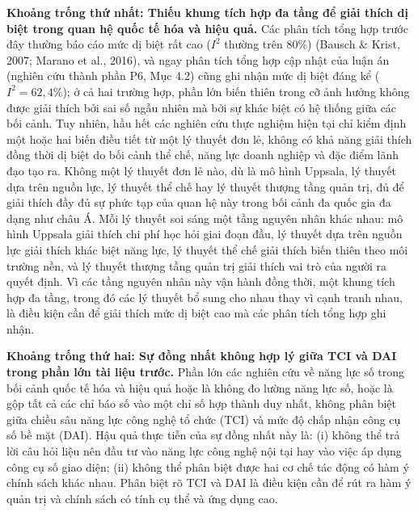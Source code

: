 \documentclass[
  a4paper,
  13pt]{extreport}
\begin{document}
\textbf{Khoảng trống thứ nhất: Thiếu khung tích hợp đa tầng để giải
thích dị biệt trong quan hệ quốc tế hóa và hiệu quả.} Các phân tích tổng
hợp trước đây thường báo cáo mức dị biệt rất cao (\(I^2\) thường trên
80\%) (Bausch \& Krist, 2007; Marano et al., 2016), và ngay phân tích
tổng hợp cập nhật của luận án (nghiên cứu thành phần P6, Mục 4.2) cũng
ghi nhận mức dị biệt đáng kể (\(I^2 = 62{,}4\%\)); ở cả hai trường hợp,
phần lớn biến thiên trong cỡ ảnh hưởng không được giải thích bởi sai số
ngẫu nhiên mà bởi sự khác biệt có hệ thống giữa các bối cảnh. Tuy nhiên,
hầu hết các nghiên cứu thực nghiệm hiện tại chỉ kiểm định một hoặc hai
biến điều tiết từ một lý thuyết đơn lẻ, không có khả năng giải thích
đồng thời dị biệt do bối cảnh thể chế, năng lực doanh nghiệp và đặc điểm
lãnh đạo tạo ra. Không một lý thuyết đơn lẻ nào, dù là mô hình Uppsala,
lý thuyết dựa trên nguồn lực, lý thuyết thể chế hay lý thuyết thượng
tầng quản trị, đủ để giải thích đầy đủ sự phức tạp của quan hệ này trong
bối cảnh đa quốc gia đa dạng như châu Á. Mỗi lý thuyết soi sáng một tầng
nguyên nhân khác nhau: mô hình Uppsala giải thích chi phí học hỏi giai
đoạn đầu, lý thuyết dựa trên nguồn lực giải thích khác biệt năng lực, lý
thuyết thể chế giải thích biến thiên theo môi trường nền, và lý thuyết
thượng tầng quản trị giải thích vai trò của người ra quyết định. Vì các
tầng nguyên nhân này vận hành đồng thời, một khung tích hợp đa tầng,
trong đó các lý thuyết bổ sung cho nhau thay vì cạnh tranh nhau, là điều
kiện cần để giải thích mức dị biệt cao mà các phân tích tổng hợp ghi
nhận.

\textbf{Khoảng trống thứ hai: Sự đồng nhất không hợp lý giữa TCI và DAI
trong phần lớn tài liệu trước.} Phần lớn các nghiên cứu về năng lực số
trong bối cảnh quốc tế hóa và hiệu quả hoặc là không đo lường năng lực
số, hoặc là gộp tất cả các chỉ báo số vào một chỉ số hợp thành duy nhất,
không phân biệt giữa chiều sâu năng lực công nghệ tổ chức (TCI) và mức
độ chấp nhận công cụ số bề mặt (DAI). Hậu quả thực tiễn của sự đồng nhất
này là: (i) không thể trả lời câu hỏi liệu nên đầu tư vào năng lực công
nghệ nội tại hay vào việc áp dụng công cụ số giao diện; (ii) không thể
phân biệt được hai cơ chế tác động có hàm ý chính sách khác nhau. Phân
biệt rõ TCI và DAI là điều kiện cần để rút ra hàm ý quản trị và chính
sách có tính cụ thể và ứng dụng cao.
\end{document}
